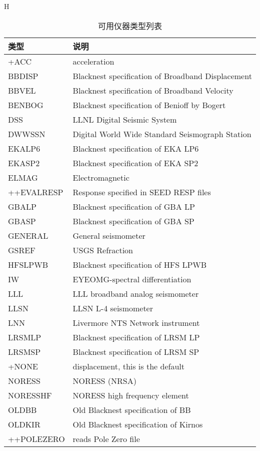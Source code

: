 \begin{table}{H}
\centering
\caption{可用仪器类型列表}	
\begin{tabular}{ll}
\toprule
类型	&	说明	\\
\midrule

+ACC     &  acceleration	\\
BBDISP   &  Blacknest specification of Broadband Displacement \\
BBVEL    &  Blacknest specification of Broadband Velocity	\\	
BENBOG   &  Blacknest specification of Benioff by Bogert	\\
DSS      &  LLNL Digital Seismic System	\\	
DWWSSN   &  Digital World Wide Standard Seismograph Station	\\
EKALP6   &  Blacknest specification of EKA LP6	\\
EKASP2   &  Blacknest specification of EKA SP2	\\
ELMAG    &  Electromagnetic	\\	
++EVALRESP &  Response specified in SEED RESP files	\\
GBALP    &  Blacknest specification of GBA LP	\\
GBASP    &  Blacknest specification of GBA SP	\\
GENERAL  &  General seismometer	\\
GSREF    &  USGS Refraction	\\
HFSLPWB  &  Blacknest specification of HFS LPWB	\\
IW       &  EYEOMG-spectral differentiation	\\
LLL      &  LLL broadband analog seismometer	\\
LLSN     &  LLSN L-4 seismometer	\\	
LNN      &  Livermore NTS Network instrument	\\
LRSMLP   &  Blacknest specification of LRSM LP	\\
LRSMSP   &  Blacknest specification of LRSM SP	\\
+NONE    &  displacement, this is the default	\\	
NORESS   &  NORESS (NRSA)	\\
NORESSHF &  NORESS high frequency element	\\
OLDBB    &  Old Blacknest specification of BB	\\
OLDKIR   &  Old Blacknest specification of Kirnos	\\	
++POLEZERO & reads Pole Zero file	\\

\end{tabular}
\end{table}

